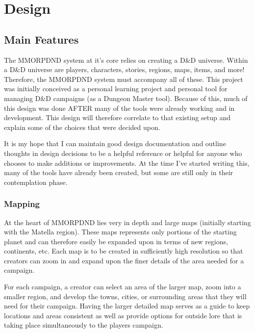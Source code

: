 \chapter{Design}
\thispagestyle{fancy}  %

\section{Main Features}

The MMORPDND system at it's core relies on creating a D\&D universe. Within a D\&D universe are players, characters, stories, regions, maps, items, and more! Therefore, the MMORPDND system must accompany all of these. This project was initially conceived as a personal learning project and personal tool for managing D\&D campaigns (as a Dungeon Master tool). Because of this, much of this design was done AFTER many of the tools were already working and in development. This design will therefore correlate to that existing setup and explain some of the choices that were decided upon.

It is my hope that I can maintain good design documentation and outline thoughts in design decisions to be a helpful reference or helpful for anyone who chooses to make additions or improvements. At the time I've started writing this, many of the tools have already been created, but some are still only in their contemplation phase. 

\subsection{Mapping}

At the heart of MMORPDND lies very in depth and large maps (initially starting with the Matella region). These maps represents only portions of the starting planet and can therefore easily be expanded upon in terms of new regions, continents, etc. Each map is to be created in sufficiently high resolution so that creators can zoom in and expand upon the finer details of the area needed for a campaign.

For each campaign, a creator can select an area of the larger map, zoom into a smaller region, and develop the towns, cities, or surrounding areas that they will need for their campaign. Having the larger detailed map serves as a guide to keep locations and areas consistent as well as provide options for outside lore that is taking place simultaneously to the players campaign.

